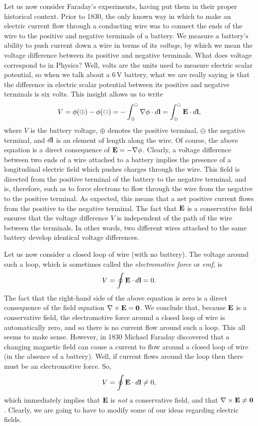 Let us now consider Faraday's experiments, having put them in their proper 
historical context.
Prior to 1830, the only known way  in which to make an electric
current flow through a conducting wire was to connect the ends of the wire to 
the positive and negative
 terminals of a battery. We measure a battery's ability to push current
down a wire in terms of its {\em voltage}, by which we mean the voltage difference
between its positive and negative terminals. What does voltage correspond
to in Physics?
Well, volts are the units used to measure electric scalar potential, so when we
talk about a 6\,V battery, what we are really saying is that the difference in 
electric scalar potential between its positive and negative terminals is six volts.
This insight allows us to write
\begin{equation}
V = \phi(\oplus)-\phi(\ominus) =
-\int_{\oplus}^{\ominus} \nabla\phi\cdot
d{\bf l} = \int_{\oplus}^{\ominus} {\bf E} \cdot d{\bf l},
\end{equation}
where $V$ is the battery voltage, $\oplus$ denotes the positive terminal,
$\ominus$ the negative terminal, and $d{\bf l}$ is an element of length along the
wire. Of course, the above equation is a direct consequence of ${\bf E} = -
\nabla\phi$. Clearly, a voltage difference  between two ends of a wire 
attached to a battery implies
the presence of a longitudinal electric field which pushes charges through the
wire. This field is directed from the positive terminal of the battery to the negative
terminal, and is, therefore, such as to force electrons to flow through the
wire from the negative to the positive terminal. As expected, this means that
  a net
positive current flows from the positive to the negative terminal. The fact that
${\bf E}$ is a conservative field ensures that the voltage  difference $V$
is independent of the
path of the wire between the terminals. In other words, two different wires attached to the same battery
develop  identical voltage differences.

Let us now consider a closed loop of wire (with no battery). The voltage around such a loop, which is sometimes called the {\em electromotive
force}\/ or {\em emf},  is
\begin{equation}
V = \oint {\bf E} \cdot d{\bf l} = 0.
\end{equation}
The fact that the right-hand side of the above equation is zero is a direct consequence of the field equation $\nabla\times{\bf E} = {\bf 0}$. 
We conclude that, because ${\bf E}$ is a conservative field,  the electromotive force around a
closed loop of wire 
is automatically zero, and  so there is no current flow around such a loop.
This all seems to make sense. However, in 1830 Michael Faraday discovered that a changing magnetic field
can cause a current to flow around a closed 
loop of wire (in the absence of a battery). 
Well, if  current flows around the loop then there must be an electromotive
force. So, 
\begin{equation}
V = \oint{\bf E} \cdot d{\bf l} \neq 0,
\end{equation}
which immediately implies that ${\bf E}$ is {\em not}\/ a conservative field, and that
$\nabla\times{\bf E} \neq {\bf 0}$. Clearly, we are going to have to modify some
of our ideas regarding electric fields.

